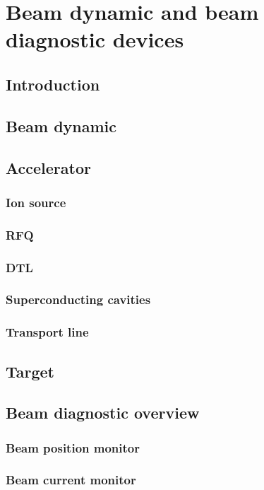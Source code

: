 \chapter{Beam dynamic and beam diagnostic devices}
\cleardoublepage

\minitoc
\section{Introduction}
\begin{refsection}
	\label{ch2:Introduction}

	\section{Beam dynamic}
	\section{Accelerator}
	\subsection{Ion source}
	\subsection{RFQ}
	\subsection{DTL}
	\subsection{Superconducting cavities}
	\subsection{Transport line}

	\section{Target}

	\section{Beam diagnostic overview}
	\subsection{Beam position monitor}
	\subsection{Beam current monitor}

\end{refsection}
